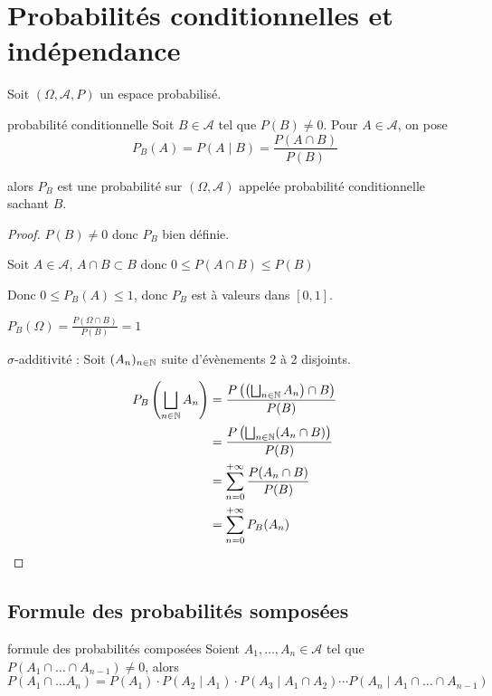 \section{Probabilités conditionnelles et indépendance }

Soit $(\Omega, \mathcal A , P)$ un espace probabilisé.

\begin{theoreme}{probabilité conditionnelle}{}
    Soit $B \in \mathcal A$ tel que $P(B) \neq 0$. Pour $A \in \mathcal A$, on pose 
    $$P_B(A) = P(A \mid B) = \frac{P(A \cap B)}{P(B)}$$

    alors $P_B$ est une probabilité sur $(\Omega, \mathcal A)$ appelée probabilité conditionnelle
    sachant $B$.
\end{theoreme}

\begin{proof}
    $P(B) \neq 0$ donc $P_B$ bien définie. 

    Soit $A \in \mathcal A$, $A \cap B \subset B$ donc $0 \leqslant P(A \cap B) \leqslant P(B)$

    Donc $0 \leqslant P_B(A) \leqslant 1$, donc $P_B$ est à valeurs dans $[0, 1]$.

    $P_B(\Omega) = \frac{P(\Omega \cap B)}{P(B)} = 1$ 

    $\sigma$-additivité : Soit $(A_n)_{n \in \mathbb{N}}$ suite d'évènements 2 à 2 disjoints.

    \begin{align}
        P_B\left( \bigsqcup_{n \in \mathbb{N}} A_n \right) & = \frac{P\left( \left( \bigsqcup_{n \in \mathbb{N}} A_n \right) \cap B \right)}{P(B)} \\
        & = \frac{P\left( \bigsqcup_{n \in \mathbb{N}} (A_n \cap B) \right)}{P(B)} \\
        & = \sum_{n = 0 }^{+ \infty } \frac{P(A_n \cap B)}{P(B)} \\
        & = \sum_{n = 0}^{+ \infty} P_B(A_n)
    \end{align}
\end{proof}

\subsection{Formule des probabilités somposées }

\begin{theoreme}{formule des probabilités composées}{}
    Soient $A_1, \dots, A_n \in \mathcal A$ tel que $P(A_1 \cap \dots \cap A_{n - 1}) \neq 0$,
    alors $$P(A_1 \cap \dots A_n) = P(A_1) \cdot P(A_2 \mid A_1) \cdot P(A_3 \mid A_1 \cap A_2) \cdots P(A_n \mid A_1 \cap \dots \cap A_{n - 1})$$
\end{theoreme}


